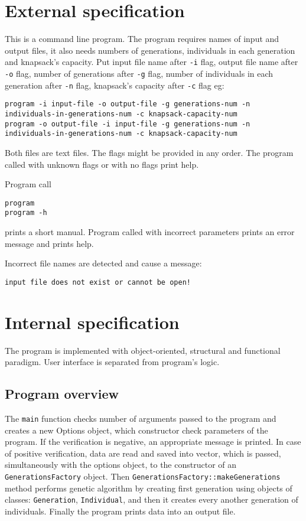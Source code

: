 \documentclass[12pt,a4paper,twoside]{article}
\begin{document}
\section{External specification}
\label{sec:external}
This is a command line program.%
The program requires names of input and output files, it also needs numbers of generations, individuals in each generation and knapsack's capacity. Put input file name after  \texttt{-i} flag, output file name after \texttt{-o} flag, number of generations after \texttt{-g} flag, number of individuals in each generation after \texttt{-n} flag, knapsack's capacity after \texttt{-c} flag eg:
\begin{verbatim}
program -i input-file -o output-file -g generations-num -n individuals-in-generations-num -c knapsack-capacity-num
program -o output-file -i input-file -g generations-num -n individuals-in-generations-num -c knapsack-capacity-num
\end{verbatim}
Both files are text files. The flags might be provided in any order. The program called with unknown flags or with no flags print help.

Program call
\begin{verbatim}
program 
program -h
\end{verbatim}
prints a short manual. Program called with incorrect parameters prints an error message and prints help.

Incorrect file names are detected and cause a message:
\begin{verbatim}
input file does not exist or cannot be open!
\end{verbatim}


\section{Internal specification}\label{sec:internal}
The program is implemented with object-oriented, structural and functional paradigm. User interface is separated from program's logic.

 

\subsection{Program overview}
The \lstinline|main| function checks number of arguments passed to the program and creates a new Options object, which constructor check parameters of the program. If the verification is negative, an appropriate message is printed. In case of positive verification, data are read and saved into vector, which is passed, simultaneously with the options object, to the constructor of an \lstinline|GenerationsFactory| object. Then \lstinline|GenerationsFactory::makeGenerations| method performs genetic algorithm by creating first generation using objects of classes: \lstinline|Generation|, \lstinline|Individual|, and then it creates every another generation of individuals. Finally the program prints data into an output file.
\end{document}

